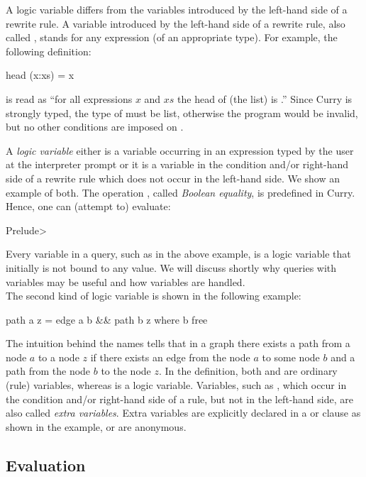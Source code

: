A logic variable differs from the variables introduced by the left-hand
side of a rewrite rule.
A variable introduced by the left-hand side of a rewrite rule,
also called ,
stands for any expression (of an appropriate type).
For example, the following definition:
%
\begin{prog}
head (x:xs) = x
\end{prog}
%
is read as ``for all expressions $x$ and $xs$ the head of (the list)
 is .''
Since Curry is strongly typed, the type of  must be list,
otherwise the program would be invalid,
but no other conditions are imposed on . 

A \emph{logic variable} either is a variable occurring in an expression
typed by the user at the interpreter prompt or
it is a variable in the condition and/or right-hand side of
a rewrite rule which does not occur in the left-hand side.
We show an example of both.
The operation \ccode{==},
called \emph{Boolean equality},
is predefined in Curry.
Hence, one can (attempt to) evaluate:
%
\begin{prog}
Prelude> 
\end{prog}
%
Every variable in a query, such as  in the above example,
is a logic variable that initially is not bound to any value.
We will discuss shortly why queries with variables
may be useful and how variables are handled.
\\[1ex]
The second kind of logic variable is shown in the following
example:
%
\begin{prog}
path a z = edge a b \&\& path b z   where b free
\end{prog}
%
The intuition behind the names tells that in a graph there exists a path
from a node $a$ to a node $z$ if there exists an edge from
the node $a$ to some node $b$ and a path from the node $b$
to the node $z$.
In the definition, both  and  are ordinary (rule)
variables, whereas  is a logic variable.
Variables, such as , which occur in the condition
and/or right-hand side of a rule, but not in the left-hand side,
are also called \emph{extra variables}.
Extra variables are explicitly declared 
in a  or  clause as shown in the example,
or are anonymous.

\subsection{Evaluation}

